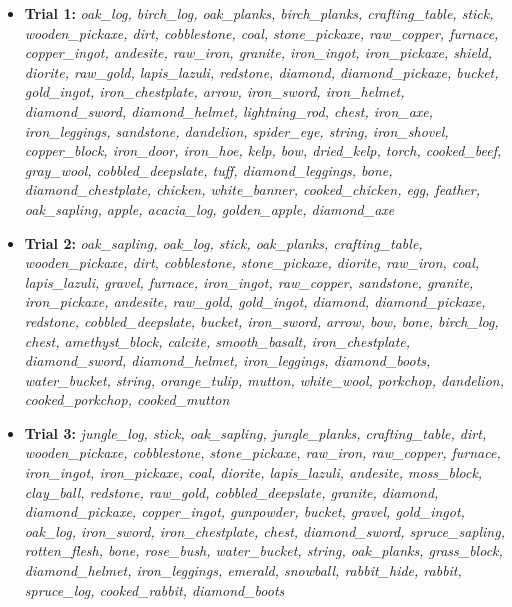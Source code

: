 \begin{itemize}
    \item \textbf{Trial 1:}  \textit{oak\_log, birch\_log, oak\_planks, birch\_planks, crafting\_table, stick, wooden\_pickaxe, dirt, cobblestone, coal, stone\_pickaxe, raw\_copper, furnace, copper\_ingot, andesite, raw\_iron, granite, iron\_ingot, iron\_pickaxe, shield, diorite, raw\_gold, lapis\_lazuli, redstone, diamond, diamond\_pickaxe, bucket, gold\_ingot, iron\_chestplate, arrow, iron\_sword, iron\_helmet, diamond\_sword, diamond\_helmet, lightning\_rod, chest, iron\_axe, iron\_leggings, sandstone, dandelion, spider\_eye, string, iron\_shovel, copper\_block, iron\_door, iron\_hoe, kelp, bow, dried\_kelp, torch, cooked\_beef, gray\_wool, cobbled\_deepslate, tuff, diamond\_leggings, bone, diamond\_chestplate, chicken, white\_banner, cooked\_chicken, egg, feather, oak\_sapling, apple, acacia\_log, golden\_apple, diamond\_axe}

    \item \textbf{Trial 2:}  \textit{oak\_sapling, oak\_log, stick, oak\_planks, crafting\_table, wooden\_pickaxe, dirt, cobblestone, stone\_pickaxe, diorite, raw\_iron, coal, lapis\_lazuli, gravel, furnace, iron\_ingot, raw\_copper, sandstone, granite, iron\_pickaxe, andesite, raw\_gold, gold\_ingot, diamond, diamond\_pickaxe, redstone, cobbled\_deepslate, bucket, iron\_sword, arrow, bow, bone, birch\_log, chest, amethyst\_block, calcite, smooth\_basalt, iron\_chestplate, diamond\_sword, diamond\_helmet, iron\_leggings, diamond\_boots, water\_bucket, string, orange\_tulip, mutton, white\_wool, porkchop, dandelion, cooked\_porkchop, cooked\_mutton}

    \item \textbf{Trial 3:}  \textit{jungle\_log, stick, oak\_sapling, jungle\_planks, crafting\_table, dirt, wooden\_pickaxe, cobblestone, stone\_pickaxe, raw\_iron, raw\_copper, furnace, iron\_ingot, iron\_pickaxe, coal, diorite, lapis\_lazuli, andesite, moss\_block, clay\_ball, redstone, raw\_gold, cobbled\_deepslate, granite, diamond, diamond\_pickaxe, copper\_ingot, gunpowder, bucket, gravel, gold\_ingot, oak\_log, iron\_sword, iron\_chestplate, chest, diamond\_sword, spruce\_sapling, rotten\_flesh, bone, rose\_bush, water\_bucket, string, oak\_planks, grass\_block, diamond\_helmet, iron\_leggings, emerald, snowball, rabbit\_hide, rabbit, spruce\_log, cooked\_rabbit, diamond\_boots}
\end{itemize}


